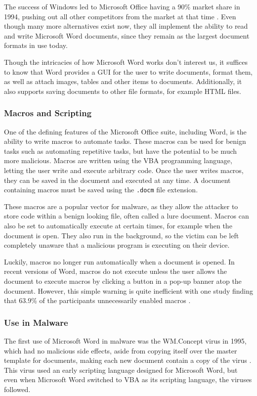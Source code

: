 The success of Windows led to Microsoft Office having a 90\% market share in 1994, pushing out all other competitors
from the market at that time \cite{bergin-word-processors}. Even though many more alternatives exist now, they all
implement the ability to read and write Microsoft Word documents, since they remain as the largest document formats 
in use today.

Though the intricacies of how Microsoft Word works don't interest us, it suffices to know that Word provides a
\acrshort{GUI} for the user to write documents, format them, as well as attach images, tables and other items to
documents. Additionally, it also supports saving documents to other file formats, for example \acrshort{HTML} files.

\subsubsection{Macros and Scripting}
One of the defining features of the Microsoft Office suite, including Word, is the ability to write macros to automate tasks.
These macros can be used for benign tasks such as automating repetitive tasks, but have the potential to be much more
malicious. Macros are written using the \acrfull{VBA} programming language, letting the user write and execute arbitrary
code. Once the user writes macros, they can be saved in the document and executed at any time. A document containing
macros must be saved using the \verb+.docm+ file extension. 

These macros are a popular vector for malware, as they allow the attacker to store code within a benign looking file,
often called a lure document. Macros can also be set to automatically execute at certain times, for example when the
document is open. They also run in the background, so the victim can be left completely unaware that a malicious program
is executing on their device.

Luckily, macros no longer run automatically when a document is opened. In recent versions of Word, macros do not execute 
unless the user allows the document to execute macros by clicking a button in a pop-up banner atop the document. 
However, this simple warning is quite inefficient with one study finding that 63.9\% of the participants unnecessarily 
enabled macros \cite{macro-viruses-users}.

\subsubsection{Use in Malware}
The first use of Microsoft Word in malware was the WM.Concept virus in 1995, which had no malicious side effects, aside from
copying itself over the master template for documents, making each new document contain a copy of the virus
\cite{malware-evolution}. This virus used an early scripting language designed for Microsoft Word, but even when
Microsoft Word switched to \acrlong{VBA} as its scripting language, the viruses followed.

